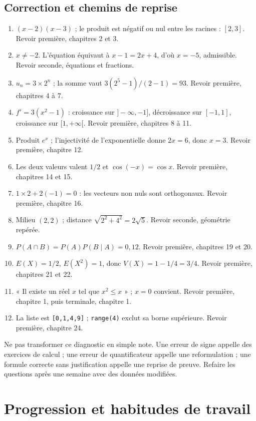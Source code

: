 \section{Correction et chemins de reprise}
\begin{enumerate}
\item $(x-2)(x-3)$ ; le produit est négatif ou nul entre les racines : $[2,3]$. Revoir première, chapitres 2 et 3.
\item $x\ne-2$. L'équation équivaut à $x-1=2x+4$, d'où $x=-5$, admissible. Revoir seconde, équations et fractions.
\item $u_n=3\times2^n$ ; la somme vaut $3(2^5-1)/(2-1)=93$. Revoir première, chapitres 4 à 7.
\item $f'=3(x^2-1)$ : croissance sur $]-\infty,-1]$, décroissance sur $[-1,1]$, croissance sur $[1,+\infty[$. Revoir première, chapitres 8 à 11.
\item Produit $e^x$ ; l'injectivité de l'exponentielle donne $2x=6$, donc $x=3$. Revoir première, chapitre 12.
\item Les deux valeurs valent $1/2$ et $\cos(-x)=\cos x$. Revoir première, chapitres 14 et 15.
\item $1\times2+2(-1)=0$ : les vecteurs non nuls sont orthogonaux. Revoir première, chapitre 16.
\item Milieu $(2,2)$ ; distance $\sqrt{2^2+4^2}=2\sqrt5$. Revoir seconde, géométrie repérée.
\item $P(A\cap B)=P(A)P(B\mid A)=0{,}12$. Revoir première, chapitres 19 et 20.
\item $E(X)=1/2$, $E(X^2)=1$, donc $V(X)=1-1/4=3/4$. Revoir première, chapitres 21 et 22.
\item « Il existe un réel $x$ tel que $x^2\le x$ » ; $x=0$ convient. Revoir première, chapitre 1, puis terminale, chapitre 1.
\item La liste est \texttt{[0,1,4,9]} ; \texttt{range(4)} exclut sa borne supérieure. Revoir première, chapitre 24.
\end{enumerate}
Ne pas transformer ce diagnostic en simple note. Une erreur de signe appelle des exercices de calcul ; une erreur de quantificateur appelle une reformulation ; une formule correcte sans justification appelle une reprise de preuve. Refaire les questions après une semaine avec des données modifiées.
\normalsize
\chapter{Progression et habitudes de travail}
